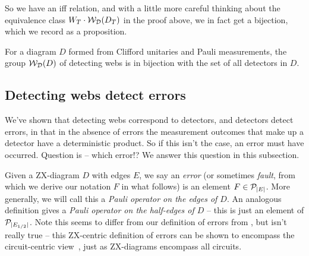So we have an iff relation, and with a little more careful thinking about the equivalence class $W_T \cdot \mathcal{W}_{\mathcal{D}}(D_T)$ in the proof above, we in fact get a bijection, which we record as a proposition.

\begin{proposition}\label{prop:detecting_webs_bijection}
    For a diagram $D$ formed from Clifford unitaries and Pauli measurements, the group $\mathcal{W}_{\mathcal{D}}(D)$ of detecting webs is in bijection with the set of all detectors in $D$.
\end{proposition}

\subsection{Detecting webs detect errors}\label{subsec:detecting_webs_detect_errors}

We've shown that detecting webs correspond to detectors, and detectors detect errors, in that in the absence of errors the measurement outcomes that make up a detector have a deterministic product.
So if this isn't the case, an error must have occurred.
Question is -- which error!?
We answer this question in this subsection.

Given a ZX-diagram $D$ with edges $E$, we say an \textit{error} (or sometimes \textit{fault}, from which we derive our notation $F$ in what follows) is an element $F \in \mathcal{P}_{|E|}$.
More generally, we will call this a \textit{Pauli operator on the edges of $D$}.
An analogous definition gives a \textit{Pauli operator on the half-edges of $D$} -- this is just an element of $\mathcal{P}_{|E_{1/2}|}$.
Note this seems to differ from our definition of errors from , but isn't really true -- this ZX-centric definition of errors can be shown to encompass the circuit-centric view~\cite{rodatz2025faulttoleranceconstruction}, just as ZX-diagrams encompass all circuits.

